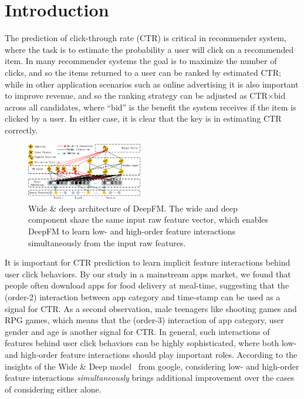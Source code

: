 \section{Introduction}\label{section:intro}
The prediction of click-through rate (CTR) is critical in recommender system, where the task is to estimate the probability a user will click on a recommended item. In many recommender systems the goal is to maximize the number of clicks, and so the items returned to a user can be ranked by estimated CTR; while in other application scenarios such as online advertising it is also important to improve revenue, and so the ranking strategy can be adjusted as CTR$\times$bid across all candidates, where ``bid'' is the benefit the system receives if the item is clicked by a user. In either case, it is clear that the key is in estimating CTR correctly.

\begin{figure}[ht]
\setlength{\abovecaptionskip}{0pt}%
\setlength{\belowcaptionskip}{-10pt}
\centering
\includegraphics[width=0.45\textwidth]{img/architecture-deepfm.png}
\caption{\footnotesize{Wide \& deep architecture of DeepFM. The wide and deep component share the same input raw feature vector, which enables DeepFM to learn low- and high-order feature interactions simultaneously from the input raw features.}}\label{fig:architecture}
\end{figure}
It is important for CTR prediction to learn implicit feature interactions behind user click behaviors. By our study in a mainstream apps market, we found that people often download apps for food delivery at meal-time, suggesting that the (order-2) interaction between app category and time-stamp can be used as a signal for CTR. As a second observation, male teenagers like shooting games and RPG games, which means that the (order-3) interaction of app category, user gender and age is another signal for CTR. In general, such interactions of features behind user click behaviors can be highly sophisticated, where both low- and high-order feature interactions should play important roles. According to the insights of the Wide \& Deep model~\cite{wide-n-deep} from google, considering low- and high-order feature interactions \emph{simultaneously} brings additional improvement over the cases of considering either alone.

